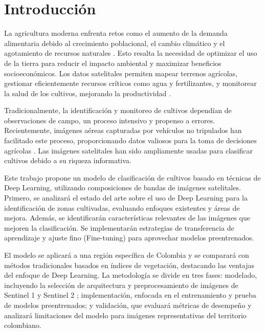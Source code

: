 \section{Introducción}
La agricultura moderna enfrenta retos como el aumento de la demanda alimentaria debido al crecimiento poblacional, el cambio climático y el agotamiento de recursos naturales \cite{thayer2020}. Esto resalta la necesidad de optimizar el uso de la tierra para reducir el impacto ambiental y maximizar beneficios socioeconómicos. Los datos satelitales permiten mapear terrenos agrícolas, gestionar eficientemente recursos críticos como agua y fertilizantes, y monitorear la salud de los cultivos, mejorando la productividad \cite{boryan2011}.

Tradicionalmente, la identificación y monitoreo de cultivos dependían de observaciones de campo, un proceso intensivo y propenso a errores. Recientemente, imágenes aéreas capturadas por vehículos no tripulados han facilitado este proceso, proporcionando datos valiosos para la toma de decisiones agrícolas \cite{hu2021}. Las imágenes satelitales han sido ampliamente usadas para clasificar cultivos debido a su riqueza informativa.

Este trabajo propone un modelo de clasificación de cultivos basado en técnicas de Deep Learning, utilizando composiciones de bandas de imágenes satelitales. Primero, se analizará el estado del arte sobre el uso de Deep Learning para la identificación de zonas cultivadas, evaluando enfoques existentes y áreas de mejora. Además, se identificarán características relevantes de las imágenes que mejoren la clasificación. Se implementarán estrategias de transferencia de aprendizaje y ajuste fino (Fine-tuning) para aprovechar modelos preentrenados.

El modelo se aplicará a una región específica de Colombia y se comparará con métodos tradicionales basados en índices de vegetación, destacando las ventajas del enfoque de Deep Learning. La metodología se divide en tres fases: modelado, incluyendo la selección de arquitectura y preprocesamiento de imágenes de Sentinel 1 y Sentinel 2 \cite{descals2021}; implementación, enfocada en el entrenamiento y prueba de modelos preentrenados; y validación, que evaluará métricas de desempeño y analizará limitaciones del modelo para imágenes representativas del territorio colombiano.
